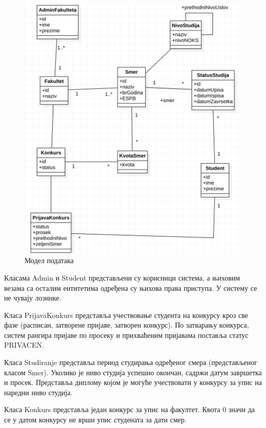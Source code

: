 \documentclass[a4paper]{article}
\begin{document}
\begin{figure}[H]
    \centering
    \includegraphics{images/class_diagram.png}
    \caption{Модел података}
    \label{fig:class_diagram}
\end{figure}

Класама Admin и Student представљени су корисници система, а њиховим везама са осталим ентитетима одређена су њихова права приступа. У систему се не чувају лозинке.

Класа PrijavaKonkurs представља учествовање студента на конкурсу кроз све фазе (расписан, затворене пријаве, затворен конкурс).
По затварању конкурса, систем рангира пријаве по просеку и прихваћеним пријавама поставља статус PRIVACEN.

Класа Studiranje представља период студирања одређеног смера (представљеног класом Smer). Уколико је ниво студија
успешно окончан, садржи датум завршетка и просек. Представља диплому којом је могуће учествовати у конкурсу за упис
на наредни ниво студија.

Класа Konkurs представља један конкурс за упис на факултет. Квота 0 значи да се у датом конкурсу не врши упис студената за дати смер.
\end{document}
